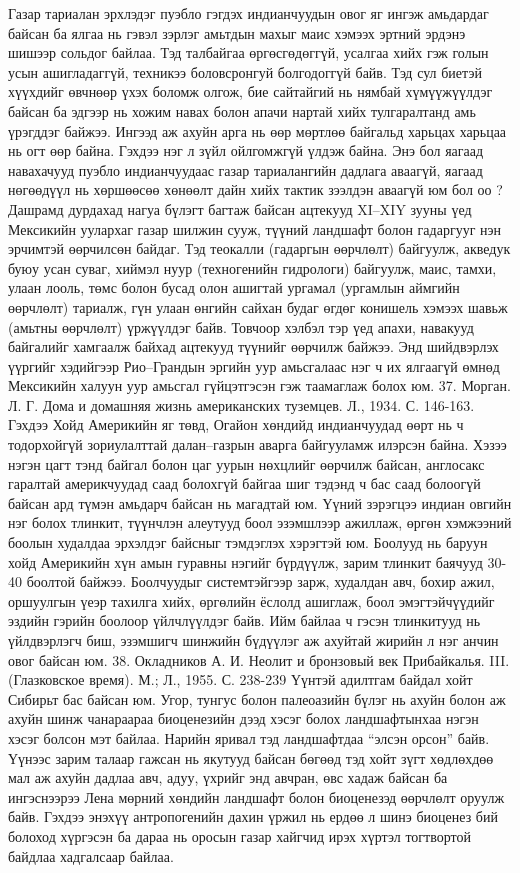 Газар тариалан эрхлэдэг пуэбло гэгдэх индианчуудын овог яг ингэж амьдардаг байсан ба ялгаа нь гэвэл зэрлэг амьтдын махыг маис хэмээх эртний эрдэнэ шишээр сольдог байлаа. Тэд талбайгаа өргөсгөдөггүй, усалгаа хийх гэж голын усын ашигладаггүй, техникээ боловсронгуй болгодоггүй байв. Тэд сул биетэй хүүхдийг өвчнөөр үхэх боломж олгож, бие сайтайгий нь нямбай хүмүүжүүлдэг байсан ба эдгээр нь хожим навах болон апачи нартай хийх тулгаралтанд амь үрэгддэг байжээ. Ингээд аж ахуйн арга нь өөр мөртлөө байгальд харьцах харьцаа нь огт өөр байна. Гэхдээ нэг л зүйл ойлгомжгүй үлдэж байна. Энэ бол яагаад навахачууд пуэбло индианчуудаас газар тариалангийн дадлага аваагүй, яагаад нөгөөдүүл нь хөршөөсөө хөнөөлт дайн хийх тактик зээлдэн аваагүй юм бол оо ?
Дашрамд дурдахад нагуа бүлэгт багтаж байсан ацтекууд XI–XIY зууны үед Мексикийн уулархаг газар шилжин сууж, түүний ландшафт болон гадаргууг нэн эрчимтэй өөрчилсөн байдаг. Тэд теокалли (гадаргын өөрчлөлт) байгуулж, акведук буюу усан суваг, хиймэл нуур (техногенийн гидрологи) байгуулж, маис, тамхи, улаан лооль, төмс болон бусад олон ашигтай ургамал (ургамлын аймгийн өөрчлөлт) тариалж, гүн улаан өнгийн сайхан будаг өгдөг конишель хэмээх шавьж (амьтны өөрчлөлт) үржүүлдэг байв. Товчоор хэлбэл тэр үед апахи, навакууд байгалийг хамгаалж байхад ацтекууд түүнийг өөрчилж байжээ.
Энд шийдвэрлэх үүргийг хэдийгээр Рио–Грандын эргийн уур амьсгалаас нэг ч их ялгаагүй өмнөд Мексикийн халуун уур амьсгал гүйцэтгэсэн гэж таамаглаж болох юм. 37. Морган. Л. Г. Дома и домашняя жизнь американских туземцев. Л., 1934. С. 146-163.
Гэхдээ Хойд Америкийн яг төвд, Огайон хөндийд индианчуудад өөрт нь ч тодорхойгүй зориулалттай далан–газрын аварга байгууламж илэрсэн байна. Хэзээ нэгэн цагт тэнд байгал болон цаг уурын нөхцлийг өөрчилж байсан, англосакс гаралтай америкчуудад саад болохгүй байгаа шиг тэдэнд ч бас саад болоогүй байсан ард түмэн амьдарч байсан нь магадтай юм.
Үүний зэрэгцээ индиан овгийн нэг болох тлинкит, түүнчлэн алеутууд боол эзэмшлээр ажиллаж, өргөн хэмжээний боолын худалдаа эрхэлдэг байсныг тэмдэглэх хэрэгтэй юм. Боолууд нь баруун хойд Америкийн хүн амын гуравны нэгийг бүрдүүлж, зарим тлинкит баячууд 30-40 боолтой байжээ. Боолчуудыг системтэйгээр зарж, худалдан авч, бохир ажил, оршуулгын үеэр тахилга хийх, өргөлийн ёслолд ашиглаж, боол эмэгтэйчүүдийг эздийн гэрийн боолоор үйлчлүүлдэг байв. Ийм байлаа ч гэсэн тлинкитууд нь үйлдвэрлэгч биш, эзэмшигч шинжийн бүдүүлэг аж ахуйтай жирийн л нэг анчин овог байсан юм. 38. Окладников А. И. Неолит и бронзовый век Прибайкалья. III. (Глазковское время). М.; Л., 1955. С. 238-239
Үүнтэй адилтгам байдал хойт Сибирьт бас байсан юм. Угор, тунгус болон палеоазийн бүлэг нь ахуйн болон аж ахуйн шинж чанараараа биоценезийн дээд хэсэг болох ландшафтынхаа нэгэн хэсэг болсон мэт байлаа. Нарийн яривал тэд ландшафтдаа “элсэн орсон” байв. Үүнээс зарим талаар гажсан нь якутууд байсан бөгөөд тэд хойт зүгт хөдлөхдөө мал аж ахуйн дадлаа авч, адуу, үхрийг энд авчран, өвс хадаж байсан ба ингэснээрээ Лена мөрний хөндийн ландшафт болон биоценезэд өөрчлөлт оруулж байв. Гэхдээ энэхүү антропогенийн дахин үржил нь ердөө л шинэ биоценез бий болоход хүргэсэн ба дараа нь оросын газар хайгчид ирэх хүртэл тогтвортой байдлаа хадгалсаар байлаа.
